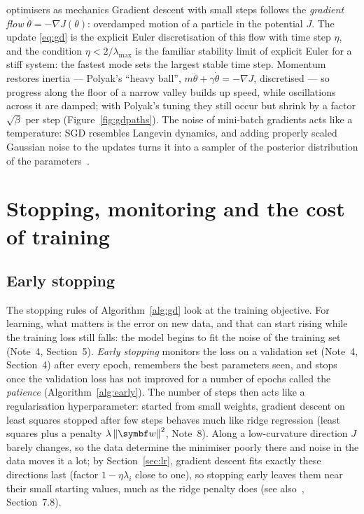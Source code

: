 \documentclass[11pt]{article}
\begin{document}
\begin{physics}{optimisers as mechanics}
Gradient descent with small steps follows the \emph{gradient flow} $\dot\theta = -\nabla J(\theta)$: overdamped motion
of a particle in the potential $J$. The update \eqref{eq:gd} is the explicit Euler discretisation of this flow with
time step $\eta$, and the condition $\eta < 2/\lambda_{\max}$ is the familiar stability limit of explicit Euler for a
stiff system: the fastest mode sets the largest stable time step. Momentum restores inertia --- Polyak's ``heavy ball'',
$m\ddot\theta + \gamma\dot\theta = -\nabla J$, discretised --- so progress along the floor of a narrow valley builds up
speed, while oscillations across it are damped; with Polyak's tuning they still occur but shrink by a factor
$\sqrt\beta$ per step (Figure~\ref{fig:gdpaths}). The noise of mini-batch gradients acts like a temperature: SGD resembles Langevin dynamics, and adding
properly scaled Gaussian noise to the updates turns it into a sampler of the posterior distribution of the
parameters~\cite{welling2011}.
\end{physics}

\section{Stopping, monitoring and the cost of training}\label{sec:early}

\subsection{Early stopping}

The stopping rules of Algorithm~\ref{alg:gd} look at the training objective. For learning, what matters is the error
on new data, and that can start rising while the training loss still falls: the model begins to fit the noise of the
training set (Note~4, Section~5). \emph{Early stopping} monitors the loss on a validation set (Note~4, Section~4) after
every epoch, remembers the best parameters seen, and stops once the validation loss has not improved for a number of
epochs called the \emph{patience} (Algorithm~\ref{alg:early}). The number of steps then acts like a regularisation
hyperparameter: started from small weights, gradient descent on least squares stopped after few steps behaves much
like ridge regression (least squares plus a penalty $\lambda\norm{\vect{w}}^2$, Note~8). Along a low-curvature direction
$J$ barely changes, so the data determine the minimiser poorly there and noise in the data moves it a lot; by
Section~\ref{sec:lr}, gradient descent fits exactly these directions last (factor $1 - \eta\lambda_i$ close to one), so
stopping early leaves them near their small starting values, much as the ridge penalty does (see
also~\cite{goodfellow2016}, Section~7.8).
\end{document}
